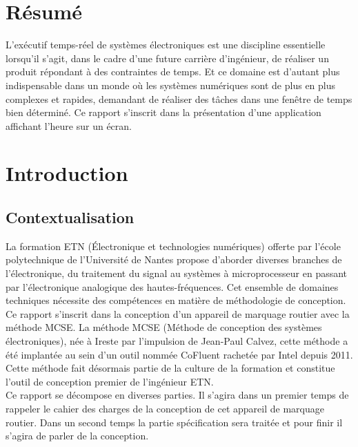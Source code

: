 \documentclass[french]{article}
\begin{document}
	\newpage
	
	\tableofcontents
	\newpage
	\listoffigures
	\listoftables
	\newpage
	
	
	\vspace*{4cm}
	\section*{Résumé}
	L'exécutif temps-réel de systèmes électroniques est une discipline essentielle lorsqu'il s'agit, dans le cadre d'une future carrière d'ingénieur, de réaliser un produit répondant à des contraintes de temps. Et ce domaine est d'autant plus indispensable dans un monde où les systèmes numériques sont de plus en plus complexes et rapides, demandant de réaliser des tâches dans une fenêtre de temps bien déterminé. Ce rapport s'inscrit dans la présentation d'une application affichant l'heure sur un écran.

	
	\newpage
	\pagestyle{plain} %
	
	\section{Introduction}
	\subsection{Contextualisation}
	La formation ETN (Électronique et technologies numériques) offerte par l'école polytechnique de l'Université de Nantes propose d'aborder diverses branches de l'électronique, du traitement du signal au systèmes à microprocesseur en passant par l'électronique analogique des hautes-fréquences. Cet ensemble de domaines techniques nécessite des compétences en matière de méthodologie de conception. Ce rapport s'inscrit dans la conception d'un appareil de marquage routier avec la méthode MCSE. La méthode MCSE (Méthode de conception des systèmes électroniques), née à Ireste par l'impulsion de Jean-Paul Calvez, cette méthode a été implantée au sein d'un outil nommée CoFluent rachetée par Intel\mbox{\textregistered } depuis 2011. Cette méthode fait désormais partie de la culture de la formation et constitue l'outil de conception premier de l'ingénieur ETN.\\
	Ce rapport se décompose en diverses parties. Il s'agira dans un premier temps de rappeler le cahier des charges de la conception de cet appareil de marquage routier. Dans un second temps la partie spécification sera traitée et pour finir il s'agira de parler de la conception.\\
	
\end{document}
